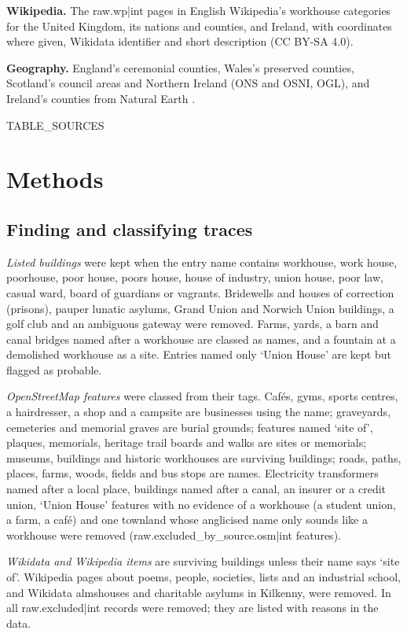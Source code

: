 \documentclass[11pt,a4paper]{article}
\begin{document}
\textbf{Wikipedia.} The {{raw.wp|int}} pages in English Wikipedia's workhouse categories for the United Kingdom, its nations and counties, and Ireland, with coordinates where given, Wikidata identifier and short description (CC BY-SA 4.0).

\textbf{Geography.} England's ceremonial counties, Wales's preserved counties, Scotland's council areas and Northern Ireland (ONS and OSNI, OGL), and Ireland's counties from Natural Earth \citep{naturalearth}.

{{TABLE_SOURCES}}

\section{Methods}
\subsection{Finding and classifying traces}
\textit{Listed buildings} were kept when the entry name contains workhouse, work house, poorhouse, poor house, poors house, house of industry, union house, poor law, casual ward, board of guardians or vagrants. Bridewells and houses of correction (prisons), pauper lunatic asylums, Grand Union and Norwich Union buildings, a golf club and an ambiguous gateway were removed. Farms, yards, a barn and canal bridges named after a workhouse are classed as names, and a fountain at a demolished workhouse as a site. Entries named only `Union House' are kept but flagged as probable.

\textit{OpenStreetMap features} were classed from their tags. Cafés, gyms, sports centres, a hairdresser, a shop and a campsite are businesses using the name; graveyards, cemeteries and memorial graves are burial grounds; features named `site of', plaques, memorials, heritage trail boards and walks are sites or memorials; museums, buildings and historic workhouses are surviving buildings; roads, paths, places, farms, woods, fields and bus stops are names. Electricity transformers named after a local place, buildings named after a canal, an insurer or a credit union, `Union House' features with no evidence of a workhouse (a student union, a farm, a café) and one townland whose anglicised name only sounds like a workhouse were removed ({{raw.excluded_by_source.osm|int}} features).

\textit{Wikidata and Wikipedia items} are surviving buildings unless their name says `site of'. Wikipedia pages about poems, people, societies, lists and an industrial school, and Wikidata almshouses and charitable asylums in Kilkenny, were removed. In all {{raw.excluded|int}} records were removed; they are listed with reasons in the data.
\end{document}

